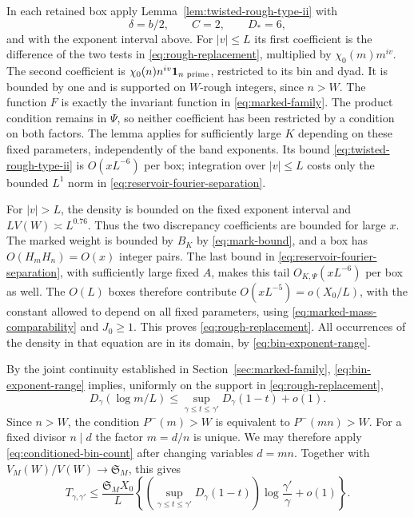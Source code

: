 In each retained box apply Lemma~\ref{lem:twisted-rough-type-ii}
with
\[
 \delta=b/2,\qquad C=2,\qquad D_*=6,
\]
and with the exponent interval above.  For $|v|\le L$ its first
coefficient is the difference of the two tests in
\eqref{eq:rough-replacement}, multiplied by $\chi_0(m)m^{iv}$.
The second coefficient is
$\chi_0(n)n^{iv}\mathbf 1_{n\text{ prime}}$, restricted to its bin and
dyad.  It is bounded by one and is supported on $W$-rough integers,
since $n>W$.  The function $F$ is exactly the invariant function
in \eqref{eq:marked-family}.  The product condition remains in
$\Psi$, so neither coefficient has been restricted by a condition
on both factors.  The lemma applies for sufficiently large $K$
depending on these fixed parameters, independently of the band
exponents.  Its bound \eqref{eq:twisted-rough-type-ii} is
$O(xL^{-6})$ per box; integration over $|v|\le L$ costs only the
bounded $L^1$ norm in \eqref{eq:reservoir-fourier-separation}.

For $|v|>L$, the density is bounded on the fixed exponent interval
and $LV(W)\asymp L^{0.76}$.  Thus the two discrepancy coefficients
are bounded for large $x$.  The marked weight is bounded by $B_K$ by
\eqref{eq:mark-bound},
and a box has $O(H_mH_n)=O(x)$ integer pairs.  The last bound in
\eqref{eq:reservoir-fourier-separation}, with sufficiently large
fixed $A$, makes this tail $O_{K,\Psi}(xL^{-6})$ per box as well.  The
$O(L)$ boxes therefore contribute $O(xL^{-5})=o(X_0/L)$, with the
constant allowed to depend on all fixed parameters, using
\eqref{eq:marked-mass-comparability} and $J_0\ge1$.  This proves
\eqref{eq:rough-replacement}.  All occurrences of the density in
that equation are in its domain, by \eqref{eq:bin-exponent-range}.

By the joint continuity established in Section~\ref{sec:marked-family},
\eqref{eq:bin-exponent-range} implies, uniformly on the support in
\eqref{eq:rough-replacement},
\[
 D_\gamma(\log m/L)
 \le\sup_{\gamma\le t\le\gamma'}D_\gamma(1-t)+o(1).
\]
Since $n>W$, the condition $P^-(m)>W$ is equivalent to
$P^-(mn)>W$.  For a fixed divisor $n\mid d$ the factor $m=d/n$ is
unique.  We may therefore apply \eqref{eq:conditioned-bin-count}
after changing variables $d=mn$.  Together with
$V_M(W)/V(W)\to\mathfrak S_M$, this gives
\begin{equation}\label{eq:least-factor-bin-upper}
 T_{\gamma,\gamma'}\le\frac{\mathfrak S_M X_0}{L}
 \left\{
   \left(\sup_{\gamma\le t\le\gamma'}D_\gamma(1-t)\right)
                   \log\frac{\gamma'}\gamma+o(1)
 \right\}.
\end{equation}

